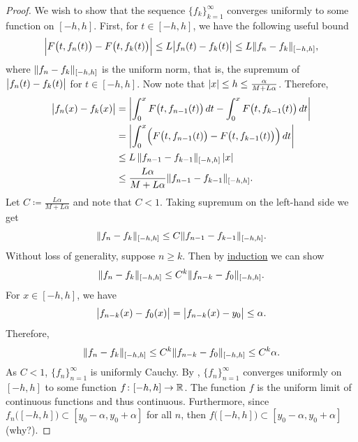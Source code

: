 \begin{proof}
We wish to show that the sequence $\{ f_k \}_{k=1}^\infty$ converges uniformly
to some function on $[-h,h]$.  First, for $t \in [-h,h]$,
we have the following
useful bound
\begin{equation*}
\Bigl\lvert {F\bigl(t,f_{n}(t)\bigr) - 
F\bigl(t,f_{k}(t)\bigr)} \Bigr\rvert
\leq
L \bigl\lvert {f_n(t)-f_k(t)} \bigr\rvert
\leq
L \lVert {f_n-f_k} \rVert_{[-h,h]} ,
\end{equation*}
where $\lVert {f_n-f_k} \rVert_{[-h,h]}$ is the uniform norm,
that is, the supremum of $\bigl\lvert {f_n(t)-f_k(t)} \bigr\rvert$ for $t \in [-h,h]$.
Now note that $\lvert {x} \rvert \leq h \leq \frac{\alpha}{M+L\alpha}$.
Therefore,
\begin{equation*}
\begin{split}
\bigl\lvert {f_n(x) - f_k(x)} \bigr\rvert
& =
\left\lvert {\int_{0}^x F\bigl(t,f_{n-1}(t)\bigr)\,dt 
-
\int_{0}^x F\bigl(t,f_{k-1}(t)\bigr)\,dt} \right\rvert
\\
& =
\left\lvert {\int_{0}^x
\Bigl(
F\bigl(t,f_{n-1}(t)\bigr)-
F\bigl(t,f_{k-1}(t)\bigr)
\Bigr)
\,dt} \right\rvert
\\
& \leq
L
\,
\lVert {f_{n-1}-f_{k-1}} \rVert_{[-h,h]}
\,
\lvert {x} \rvert
\\
& \leq
\frac{L\alpha}{M+L\alpha}
\lVert {f_{n-1}-f_{k-1}} \rVert_{[-h,h]} .
\end{split}
\end{equation*}
Let $C \coloneqq \frac{L\alpha}{M+L\alpha}$ and note that $C < 1$.
Taking supremum on the left-hand side we get
\begin{equation*}
\lVert {f_n-f_k} \rVert_{[-h,h]} \leq C \lVert {f_{n-1}-f_{k-1}} \rVert_{[-h,h]} .
\end{equation*}
Without loss of generality,
suppose $n \geq k$.  Then by \hyperref[induction:thm]{induction} we can show 
\begin{equation*}
\lVert {f_n-f_k} \rVert_{[-h,h]} \leq C^{k} \lVert {f_{n-k}-f_{0}} \rVert_{[-h,h]} .
\end{equation*}
For $x \in [-h,h]$, we have
\begin{equation*}
\bigl\lvert {f_{n-k}(x)-f_{0}(x)} \bigr\rvert
=
\bigl\lvert {f_{n-k}(x)-y_0} \bigr\rvert
\leq \alpha .
\end{equation*}
Therefore,
\begin{equation*}
\lVert {f_n-f_k} \rVert_{[-h,h]} \leq C^{k} \lVert {f_{n-k}-f_{0}} \rVert_{[-h,h]} \leq C^{k} \alpha .
\end{equation*}
As $C < 1$, $\{f_n\}_{n=1}^\infty$ is uniformly Cauchy.
By , $\{ f_n \}_{n=1}^\infty$
converges uniformly on $[-h,h]$ to some function $f \colon [-h,h] \to {\mathbb{R}}$.
The function $f$ is the uniform limit of continuous functions and thus
continuous.  Furthermore, since $f_n\bigl([-h,h]\bigr) \subset
[y_0-\alpha,y_0+\alpha]$ for all $n$,
then $f\bigl([-h,h]\bigr) \subset [y_0-\alpha,y_0+\alpha]$
(why?).



\end{proof}
